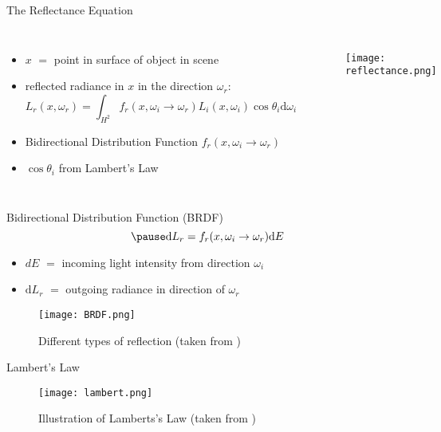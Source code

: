 \begin{frame}{The Reflectance Equation}
\begin{columns}
\begin{itemize}
    \item $x$ $=$ point in surface of object in scene
    \pause
    \item reflected radiance in $x$ in the direction $\omega_r$: 
    \pause
    \begin{equation} 
L_r(x, \omega_r) = \int_{H^2} f_r(x, \omega_i \rightarrow \omega_r) L_i(x, \omega_i) \cos \theta_i \mathrm{d}\omega_i
\end{equation}
	\pause
    \item Bidirectional Distribution Function $f_r(x, \omega_i \rightarrow \omega_r) $
    \item $\cos \theta_i$ from Lambert's Law
\end{itemize}
\begin{figure}
\texttt{[image: reflectance.png]}
\end{figure}
\end{columns}
\end{frame}

\begin{frame}{Bidirectional Distribution Function (BRDF)}
\begin{equation}
\pause
\mathrm{d}L_r = f_r(x, \omega_i \rightarrow \omega_r) \mathrm{d}E
\end{equation}
\begin{itemize}
    \item  $dE$ $=$ incoming light intensity from direction $\omega_i$ 
    \item $\mathrm{d}L_r$ $=$ outgoing radiance in direction of $\omega_r$
\end{itemize}
\begin{center}
\begin{figure}
\texttt{[image: BRDF.png]}
\caption{Different types of reflection (taken from \cite{Bungartz.2014})}
\end{figure}
\end{center}
\end{frame}

\begin{frame}{Lambert's Law}
\begin{center}
\begin{figure}
    \texttt{[image: lambert.png]}
    \caption{Illustration of Lamberts's Law (taken from \cite{Pharr.2023})}
\end{figure}
\end{center}
\end{frame}

